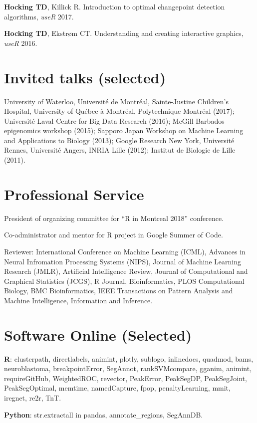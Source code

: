 \documentclass[margin,line]{res}
\begin{document}
\begin{resume}
{\bf Hocking TD}, Killick R. Introduction to optimal changepoint detection algorithms, {\it useR} 2017.

{\bf Hocking TD}, Ekstr\o m CT. Understanding and creating interactive
graphics, {\it useR} 2016.

\section{\sc Invited talks (selected)}

University of Waterloo, Université de Montréal, Sainte-Justine
Children's Hospital, University of Québec à Montréal, Polytechnique
Montréal (2017); Universit\'e Laval Centre for Big Data Research
(2016); McGill Barbados epigenomics workshop (2015); Sapporo Japan
Workshop on Machine Learning and Applications to Biology (2013);
Google Research New York, Universit\'e Rennes,
Universit\'e Angers, INRIA Lille  (2012); Institut de Biologie
de Lille (2011).

\section{\sc Professional Service}

President of organizing committee for ``R in Montreal 2018'' conference.

Co-administrator and mentor for R project in Google Summer of Code.

Reviewer: International Conference on Machine Learning (ICML),
Advances in Neural Infromation Processing Systems (NIPS), Journal of
Machine Learning Research (JMLR), Artificial Intelligence Review,
Journal of Computational and Graphical Statistics (JCGS), R Journal,
Bioinformatics, PLOS Computational Biology, BMC Bioinformatics, IEEE
Transactions on Pattern Analysis and Machine Intelligence, Information
and Inference.

\section{\sc Software Online (Selected)} 

{\bf R}: clusterpath, directlabels, animint, plotly, sublogo,
inlinedocs, quadmod, bams, neuroblastoma, breakpointError, SegAnnot,
rankSVMcompare, gganim, animint, requireGitHub, WeightedROC, revector,
PeakError, PeakSegDP, PeakSegJoint, PeakSegOptimal, memtime,
namedCapture, fpop, \mbox{penaltyLearning}, mmit, iregnet, re2r, TnT.

{\bf Python}: str.extractall in pandas, annotate\_regions, SegAnnDB.


\end{resume}
\end{document}
